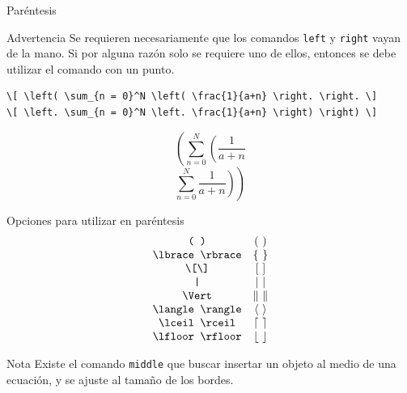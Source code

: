 \documentclass[../slides.tex]{subfiles}
\begin{document}
    \begin{frame}[fragile]{Paréntesis}
        \begin{alertblock}{Advertencia}
        	Se requieren necesariamente que los comandos \texttt{left} y \texttt{right} vayan de la mano. Si por alguna razón solo se requiere uno de ellos, entonces se debe utilizar el comando con un punto.
        \end{alertblock}
{\footnotesize{
        \begin{verbatim}
\[ \left( \sum_{n = 0}^N \left( \frac{1}{a+n} \right. \right. \]
\[ \left. \sum_{n = 0}^N \left. \frac{1}{a+n} \right) \right) \]
        \end{verbatim}}}
\[ \left( \sum_{n = 0}^N \left( \frac{1}{a+n} \right. \right. \]
\[ \left. \sum_{n = 0}^N \left. \frac{1}{a+n} \right) \right) \]
    \end{frame}
    
    \begin{frame}[fragile]{Opciones para utilizar en paréntesis}
        \begin{align*}
            \begin{array}{cc}
                \text{\texttt{( )}} & (\ )\\
                \text{\texttt{\textbackslash lbrace \textbackslash rbrace}} & \lbrace\ \rbrace\\
                \text{\texttt{\textbackslash [\textbackslash ]}}  & [\ ]\\
                \text{\texttt{|}}  & |\ |\\
                \text{\texttt{\textbackslash Vert}}  & \Vert \ \Vert\\
                \text{\texttt{\textbackslash langle \textbackslash rangle}} & \langle\ \rangle\\
                \text{\texttt{\textbackslash lceil \textbackslash rceil}} & \lceil\ \rceil\\
                \text{\texttt{\textbackslash lfloor \textbackslash rfloor}} & \lfloor\ \rfloor
            \end{array}
        \end{align*}
        \begin{block}{Nota}
        	Existe el comando \texttt{middle} que buscar insertar un objeto al medio de una ecuación, y se ajuste al tamaño de los bordes.
        \end{block}

    \end{frame}
    
\end{document}
